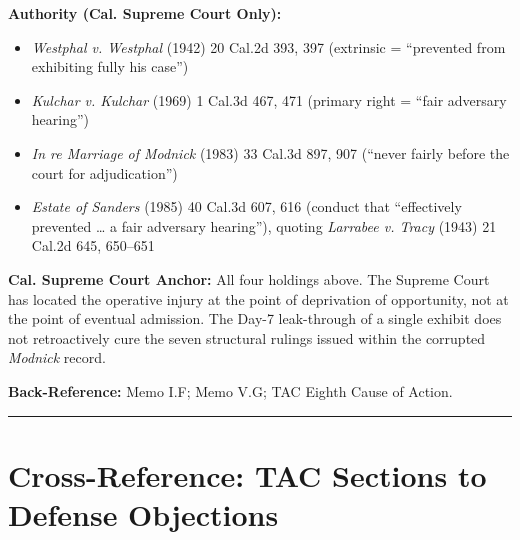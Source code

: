 \textbf{Authority (Cal. Supreme Court Only):}

\begin{itemize}
\tightlist
\item
  \emph{Westphal v. Westphal} (1942) 20 Cal.2d 393, 397 (extrinsic = ``prevented from exhibiting fully his case'')
\item
  \emph{Kulchar v. Kulchar} (1969) 1 Cal.3d 467, 471 (primary right = ``fair adversary hearing'')
\item
  \emph{In re Marriage of Modnick} (1983) 33 Cal.3d 897, 907 (``never fairly before the court for adjudication'')
\item
  \emph{Estate of Sanders} (1985) 40 Cal.3d 607, 616 (conduct that ``effectively prevented \ldots{} a fair adversary hearing''), quoting \emph{Larrabee v. Tracy} (1943) 21 Cal.2d 645, 650--651
\end{itemize}

\textbf{Cal. Supreme Court Anchor:} All four holdings above. The Supreme Court has located the operative injury at the point of deprivation of opportunity, not at the point of eventual admission. The Day-7 leak-through of a single exhibit does not retroactively cure the seven structural rulings issued within the corrupted \emph{Modnick} record.

\textbf{Back-Reference:} Memo \textsection{} I.F; Memo \textsection{} V.G; TAC Eighth Cause of Action.

\begin{center}\rule{0.5\linewidth}{0.5pt}\end{center}

\section{Cross-Reference: TAC Sections to Defense Objections}\label{cross-reference-tac-sections-to-defense-objections}


